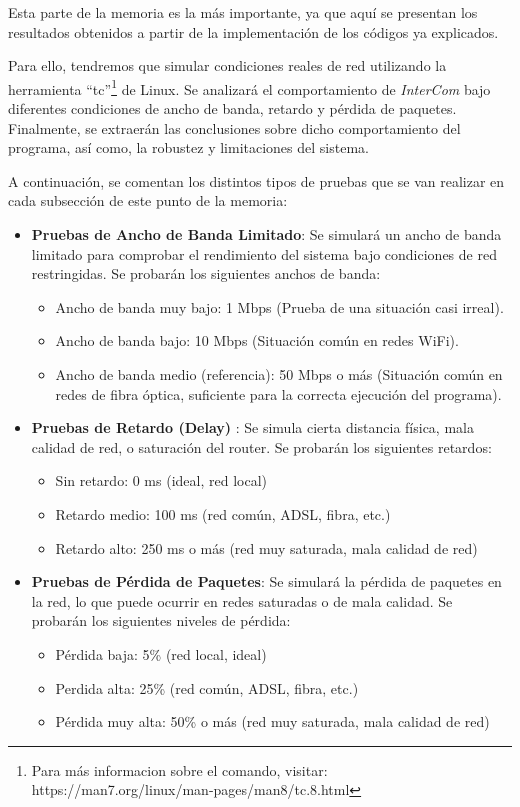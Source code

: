 \label{sec:resultados_y_discusion}

Esta parte de la memoria es la más importante, ya que aquí se presentan los resultados obtenidos a partir de la implementación de los códigos ya explicados. 
\vspace{\baselineskip}

Para ello, tendremos que simular condiciones reales de red utilizando la herramienta ``tc''\footnote{Para más informacion sobre el comando, visitar: https://man7.org/linux/man-pages/man8/tc.8.html} de Linux. Se analizará el comportamiento de \textit{InterCom} bajo diferentes condiciones de ancho de banda, retardo y pérdida de paquetes. Finalmente, se extraerán las conclusiones sobre dicho comportamiento del programa, así como, la robustez y limitaciones del sistema.
\vspace{\baselineskip}

A continuación, se comentan los distintos tipos de pruebas que se van realizar en cada subsección de este punto de la memoria:
\begin{itemize}
    \item \textbf{Pruebas de Ancho de Banda Limitado}: Se simulará un ancho de banda limitado para comprobar el rendimiento del sistema bajo condiciones de red restringidas. Se probarán los siguientes anchos de banda:
    \begin{itemize}
        \item Ancho de banda muy bajo: 1 Mbps (Prueba de una situación casi irreal).
        \item Ancho de banda bajo: 10 Mbps (Situación común en redes WiFi).
        \item Ancho de banda medio (referencia): 50 Mbps o más (Situación común en redes de fibra óptica, suficiente para la correcta ejecución del programa).
    \end{itemize}
    \item \textbf{Pruebas de Retardo (Delay)} : Se simula cierta distancia física, mala calidad de red, o saturación del router. Se probarán los siguientes retardos:
    \begin{itemize}
        \item Sin retardo: 0 ms (ideal, red local)
        \item Retardo medio: 100 ms (red común, ADSL, fibra, etc.)
        \item Retardo alto: 250 ms o más (red muy saturada, mala calidad de red)
    \end{itemize}
    \item \textbf{Pruebas de Pérdida de Paquetes}: Se simulará la pérdida de paquetes en la red, lo que puede ocurrir en redes saturadas o de mala calidad. Se probarán los siguientes niveles de pérdida: 
    \begin{itemize}
        \item Pérdida baja: 5\% (red local, ideal)
        \item Perdida alta: 25\% (red común, ADSL, fibra, etc.)
        \item Pérdida muy alta: 50\% o más (red muy saturada, mala calidad de red)
    \end{itemize}
\end{itemize}

